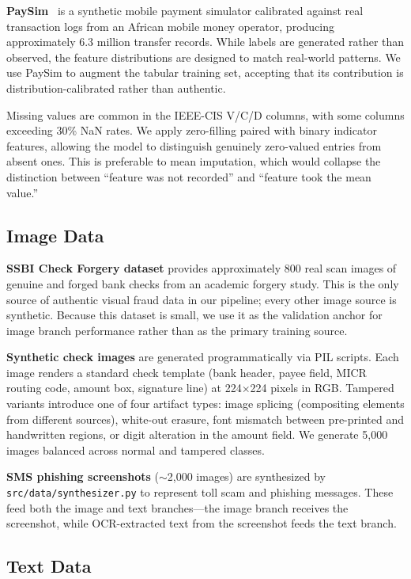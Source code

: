 \documentclass[10pt,conference,letterpaper]{IEEEtran}
\begin{document}
\textbf{PaySim}~\cite{PaySim} is a synthetic mobile payment simulator calibrated against
real transaction logs from an African mobile money operator, producing approximately 6.3
million transfer records. While labels are generated rather than observed, the feature
distributions are designed to match real-world patterns. We use PaySim to augment the
tabular training set, accepting that its contribution is distribution-calibrated rather
than authentic.

Missing values are common in the IEEE-CIS V/C/D columns, with some columns exceeding
30\% NaN rates. We apply zero-filling paired with binary indicator features, allowing
the model to distinguish genuinely zero-valued entries from absent ones. This is
preferable to mean imputation, which would collapse the distinction between ``feature
was not recorded'' and ``feature took the mean value.''

\subsection{Image Data}

\textbf{SSBI Check Forgery dataset} provides approximately 800 real scan images of
genuine and forged bank checks from an academic forgery study. This is the only source
of authentic visual fraud data in our pipeline; every other image source is synthetic.
Because this dataset is small, we use it as the validation anchor for image branch
performance rather than as the primary training source.

\textbf{Synthetic check images} are generated programmatically via PIL scripts. Each
image renders a standard check template (bank header, payee field, MICR routing code,
amount box, signature line) at 224$\times$224 pixels in RGB. Tampered variants introduce
one of four artifact types: image splicing (compositing elements from different sources),
white-out erasure, font mismatch between pre-printed and handwritten regions, or digit
alteration in the amount field. We generate 5,000 images balanced across normal and
tampered classes.

\textbf{SMS phishing screenshots} ($\sim$2,000 images) are synthesized by
\texttt{src/data/synthesizer.py} to represent toll scam and phishing messages. These
feed both the image and text branches---the image branch receives the screenshot, while
OCR-extracted text from the screenshot feeds the text branch.

\subsection{Text Data}
\end{document}
